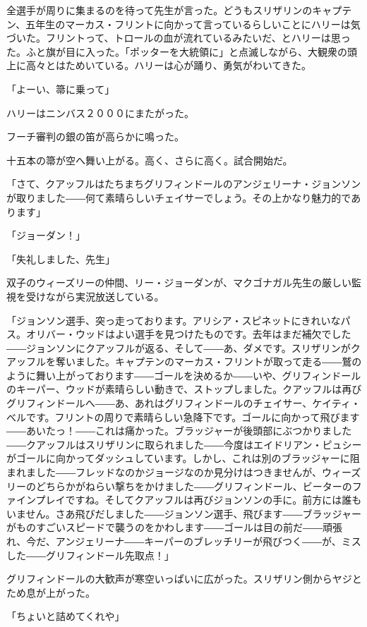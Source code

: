 \documentclass[10pt,a4paper]{article}
\begin{document}
\begin{CJK}{UTF8}{min}
全選手が周りに集まるのを待って先生が言った。どうもスリザリンのキャプテン、五年生のマーカス・フリントに向かって言っているらしいことにハリーは気づいた。フリントって、トロールの血が流れているみたいだ、とハリーは思った。ふと旗が目に入った。「ポッターを大統領に」と点滅しながら、大観衆の頭上に高々とはためいている。ハリーは心が踊り、勇気がわいてきた。

「よーい、箒に乗って」

ハリーはニンバス２０００にまたがった。

フーチ審判の銀の笛が高らかに鳴った。

十五本の箒が空へ舞い上がる。高く、さらに高く。試合開始だ。

「さて、クアッフルはたちまちグリフィンドールのアンジェリーナ・ジョンソンが取りました――何て素晴らしいチェイサーでしょう。その上かなり魅力的であります」

「ジョーダン！」

「失礼しました、先生」

双子のウィーズリーの仲間、リー・ジョーダンが、マクゴナガル先生の厳しい監視を受けながら実況放送している。

「ジョンソン選手、突っ走っております。アリシア・スピネットにきれいなパス。オリバー・ウッドはよい選手を見つけたものです。去年はまだ補欠でした――ジョンソンにクアッフルが返る、そして――あ、ダメです。スリザリンがクアッフルを奪いました。キャプテンのマーカス・フリントが取って走る――鷲のように舞い上がっております――ゴールを決めるか――いや、グリフィンドールのキーパー、ウッドが素晴らしい動きで、ストップしました。クアッフルは再びグリフィンドールへ――あ、あれはグリフィンドールのチェイサー、ケイティ・べルです。フリントの周りで素晴らしい急降下です。ゴールに向かって飛びます――あいたっ！――これは痛かった。ブラッジャーが後頭部にぶつかりました――クアッフルはスリザリンに取られました――今度はエイドリアン・ピュシーがゴールに向かってダッシュしています。しかし、これは別のブラッジャーに阻まれました――フレッドなのかジョージなのか見分けはつきませんが、ウィーズリーのどちらかがねらい撃ちをかけました――グリフィンドール、ビーターのファインプレイですね。そしてクアッフルは再びジョンソンの手に。前方には誰もいません。さあ飛びだしました――ジョンソン選手、飛びます――ブラッジャーがものすごいスピードで襲うのをかわします――ゴールは目の前だ――頑張れ、今だ、アンジェリーナ――キーパーのブレッチリーが飛びつく――が、ミスした――グリフィンドール先取点！」

グリフィンドールの大歓声が寒空いっぱいに広がった。スリザリン側からヤジとため息が上がった。

「ちょいと詰めてくれや」


\end{CJK}
\end{document}
